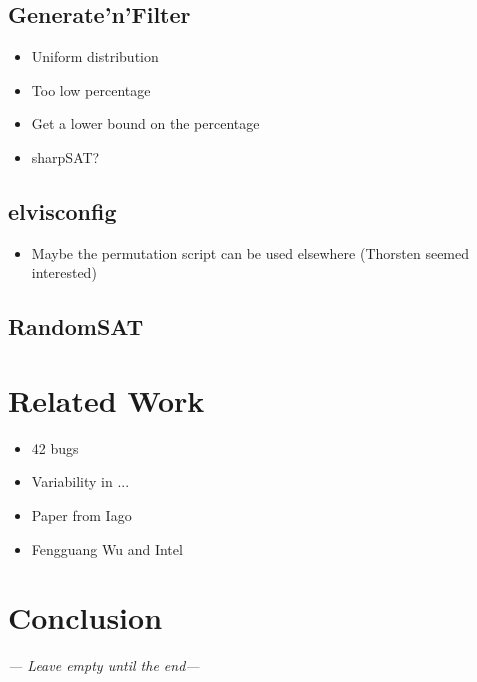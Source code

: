 \documentclass[a4paper,11pt]{article}
\begin{document}
\subsection{Generate'n'Filter}

\begin{itemize}
    \item Uniform distribution
    \item Too low percentage
    \item Get a lower bound on the percentage
    \item sharpSAT?
\end{itemize}

\subsection{elvisconfig}

\begin{itemize}
    \item Maybe the permutation script can be used elsewhere (Thorsten seemed 
        interested)
\end{itemize}

\subsection{RandomSAT}





\newpage
\section{Related Work}

\begin{itemize}
    \item 42 bugs
    \item Variability in ...
    \item Paper from Iago
    \item Fengguang Wu and Intel
\end{itemize}



\newpage
\section{Conclusion}
\emph{--- Leave empty until the end---}




\newpage

\end{document}
